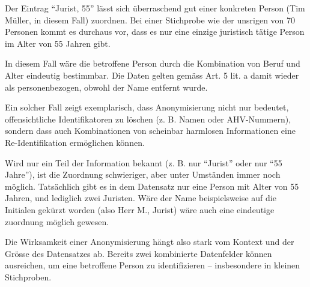 \begin{aufgabe}{4}

Der Eintrag ``Jurist, 55'' lässt sich überraschend gut einer konkreten Person (Tim Müller, in diesem Fall) zuordnen. Bei einer Stichprobe wie der unsrigen von 70 Personen kommt es durchaus vor, dass es nur eine einzige juristisch tätige Person im Alter von 55 Jahren gibt.

In diesem Fall wäre die betroffene Person durch die Kombination von Beruf und Alter eindeutig bestimmbar. Die Daten gelten gemäss Art. 5 lit. a damit wieder als personenbezogen, obwohl der Name entfernt wurde.

Ein solcher Fall zeigt exemplarisch, dass Anonymisierung nicht nur bedeutet, offensichtliche Identifikatoren zu löschen (z. B. Namen oder AHV-Nummern), sondern dass auch Kombinationen von scheinbar harmlosen Informationen eine Re-Identifikation ermöglichen können.

\vspace{0.5em}

Wird nur ein Teil der Information bekannt (z. B. nur ``Jurist'' oder nur ``55 Jahre''), ist die Zuordnung schwieriger, aber unter Umständen immer noch möglich. Tatsächlich gibt es in dem Datensatz nur eine Person mit Alter von 55 Jahren, und lediglich zwei Juristen. Wäre der Name beispielsweise auf die Initialen gekürzt worden (also Herr M., Jurist) wäre auch eine eindeutige zuordnung möglich gewesen.


Die Wirksamkeit einer Anonymisierung hängt also stark vom Kontext und der Grösse des Datensatzes ab. Bereits zwei kombinierte Datenfelder können ausreichen, um eine betroffene Person zu identifizieren – insbesondere in kleinen Stichproben.

\end{aufgabe}



